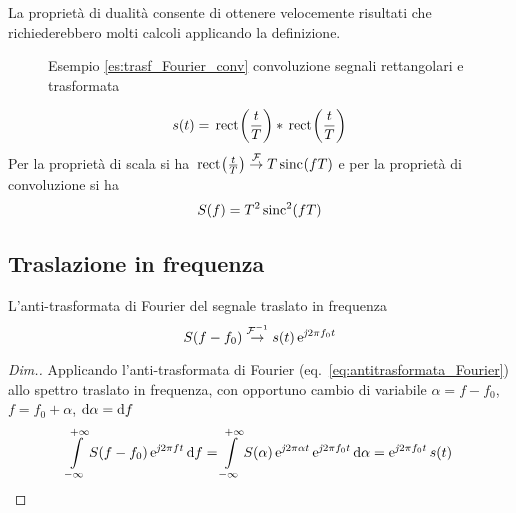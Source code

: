 \begin{nota}
	La proprietà di dualità consente di ottenere velocemente risultati che richiederebbero molti calcoli applicando la definizione.
\end{nota}

\begin{esempio}
\label{es:trasf_Fourier_conv}

\begin{figure}[!ht]
	\centering
	\qquad
	\caption{Esempio \ref{es:trasf_Fourier_conv} convoluzione segnali rettangolari e trasformata}
\end{figure}

\[
	s(t)=\,{\operatorname{rect}}^{}\!\left({\frac{t}{T}}\right)\ast\,{\operatorname{rect}}^{}\!\left({\frac{t}{T}}\right)
\]
Per la proprietà di scala si ha $\,{\operatorname{rect}}^{}\!\left({\frac{t}{T}}\right)\overset{\operatorname{\mathcal{F}}}{\to}T\,{\operatorname{sinc}}^{}\!\left({f T}\right)$ e per la proprietà di convoluzione si ha
\[
	S(f)=T^2\operatorname{sinc}^2(f T)
\]
\end{esempio}

\subsection{Traslazione in frequenza}
L'anti-trasformata di Fourier del segnale traslato in frequenza
\begin{equation}
	S(f-f_0)\overset{\operatorname{\mathcal{F}}^{-1}}{\rightarrow}s(t)\operatorname{e}^{\operatorname{\mathit{j}\!} 2\pi f_0 t}
\end{equation}

\begin{proof}[Dim.]
Applicando l'anti-trasformata di Fourier (eq.~\ref{eq:antitrasformata_Fourier}) allo spettro traslato in frequenza, con opportuno cambio di variabile $\alpha=f-f_0$, $f=f_0+\alpha$, $\mathop{}\!\mathrm{d}\alpha=\mathop{}\!\mathrm{d} f$
\[
	\int\limits_{-\infty}^{+\infty}{S(f-f_0)\operatorname{e}^{\operatorname{\mathit{j}\!} 2\pi f t}}{\,\mathop{}\!\mathrm{d}{f}}=
	\int\limits_{-\infty}^{+\infty}{S(\alpha)\operatorname{e}^{\operatorname{\mathit{j}\!} 2\pi\alpha t}\operatorname{e}^{\operatorname{\mathit{j}\!} 2\pi f_0 t}}{\,\mathop{}\!\mathrm{d}{\alpha}}=\operatorname{e}^{\operatorname{\mathit{j}\!} 2\pi f_0 t} s(t)
\qedhere
\]
\end{proof}

